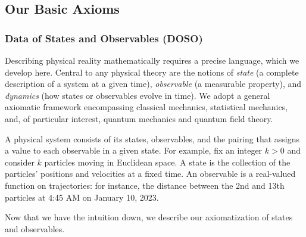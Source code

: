 \newpage 

\subsection{Our Basic Axioms}

\subsubsection{Data of States and Observables (DOSO)}

Describing physical reality mathematically requires a precise language, which we develop here. Central to any physical theory are the notions of \textit{state} (a complete description of a system at a given time), \textit{observable} (a measurable property), and \textit{dynamics} (how states or observables evolve in time). We adopt a general axiomatic framework encompassing classical mechanics, statistical mechanics, and, of particular interest, quantum mechanics and quantum field theory.

A physical system consists of its states, observables, and the pairing that assigns a value to each observable in a given state. For example, fix an integer $k > 0$ and consider $k$ particles moving in Euclidean space. A state is the collection of the particles' positions and velocities at a fixed time. An observable is a real-valued function on trajectories: for instance, the distance between the 2nd and 13th particles at 4:45 AM on January 10, 2023.

Now that we have the intuition down, we describe our axiomatization of states and observables.

